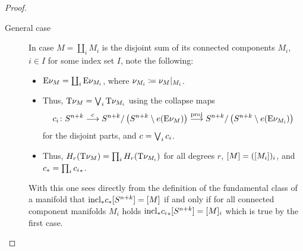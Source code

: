 \begin{Lem}
\begin{proof}
\begin{description}
    \item[General case] In case $M=\coprod_i M_i$ is the disjoint sum of its connected
      components $M_i$, $i\in I$ for some index set $I$, note the following:
      \begin{itemize}
      \item $\mathrm{E}\nu_{M} = \coprod_i\mathrm{E}\nu_{M_i}$,
        where $\nu_{M_i}\coloneqq\nu_{M}|_{M_i}$.
      \item Thus, $\mathrm{T}{\nu_{M}} = \bigvee_i\mathrm{T}{\nu_{M_i}}$ using the
        collapse maps
        \begin{gather*}
          c_i\colon
          S^{n+k}
          \overset{c}{\longrightarrow}
          S^{n+k}/\left(S^{n+k}\setminus e(\mathrm{E}\nu_{M})\right)
          \overset{\mathrm{proj}}{\longrightarrow}
          S^{n+k}/\left(S^{n+k}\setminus e(\mathrm{E}\nu_{M_i})\right)
        \end{gather*}
        for the disjoint parts,
        and $c=\bigvee_ic_i$.
      \item Thus, $H_r(\mathrm{T}{\nu_{M}}) = \prod_i H_r(\mathrm{T}{\nu_{M_i}})$ for
        all degrees $r$, $[M] = ([M_i])_i$, and
        ${c}_* = \prod_i{c_i}_*$.
      \end{itemize}
      With this one sees directly from the definition of the fundamental
      class of a manifold that
      ${\mathrm{incl}}_*{c}_*[S^{n+k}] = [M]$
      if and only if for all connected component manifolds $M_i$ holds
      ${\mathrm{incl}}_*{c_i}_*[S^{n+k}] = [M]_i$
      which is true by the first case.
      \qedhere
    \end{description}
  \end{proof}
\end{Lem}


